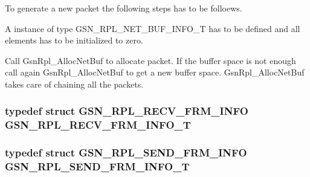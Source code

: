 To generate a new packet the following steps has to be folloews.
\begin{DoxyItemize}
\item A instance of type GSN\_\-RPL\_\-NET\_\-BUF\_\-INFO\_\-T has to be defined and all elements has to be initialized to zero.
\item Call GsnRpl\_\-AllocNetBuf to allocate packet. If the buffer space is not enough call again GsnRpl\_\-AllocNetBuf to get a new buffer space. GsnRpl\_\-AllocNetBuf takes care of chaining all the packets. 
\end{DoxyItemize}\hypertarget{a00580_a61f57186267c3617b1816c75d639b467}{
\subsubsection[{GSN\_\-RPL\_\-RECV\_\-FRM\_\-INFO\_\-T}]{\setlength{\rightskip}{0pt plus 5cm}typedef struct {\bf GSN\_\-RPL\_\-RECV\_\-FRM\_\-INFO} {\bf GSN\_\-RPL\_\-RECV\_\-FRM\_\-INFO\_\-T}}}
\label{a00580_a61f57186267c3617b1816c75d639b467}
\hypertarget{a00580_ae5a3a277cf1fd6ef3ce9dbf918e7c2d8}{
\subsubsection[{GSN\_\-RPL\_\-SEND\_\-FRM\_\-INFO\_\-T}]{\setlength{\rightskip}{0pt plus 5cm}typedef struct {\bf GSN\_\-RPL\_\-SEND\_\-FRM\_\-INFO} {\bf GSN\_\-RPL\_\-SEND\_\-FRM\_\-INFO\_\-T}}}
\label{a00580_ae5a3a277cf1fd6ef3ce9dbf918e7c2d8}


